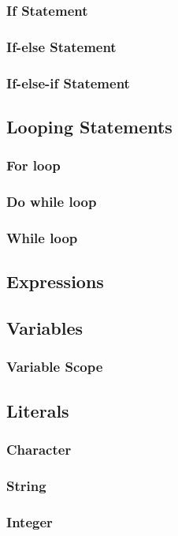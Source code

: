 \documentclass{book}
\begin{document}
\subsubsection{If Statement}
\subsubsection{If-else Statement}
\subsubsection{If-else-if Statement}
\subsection{Looping Statements}
\subsubsection{For loop}
\subsubsection{Do while loop}
\subsubsection{While loop}
\subsection{Expressions}
\subsection{Variables}
\subsubsection{Variable Scope}
\subsection{Literals}
\subsubsection{Character}
\subsubsection{String}
\subsubsection{Integer}
\end{document}
